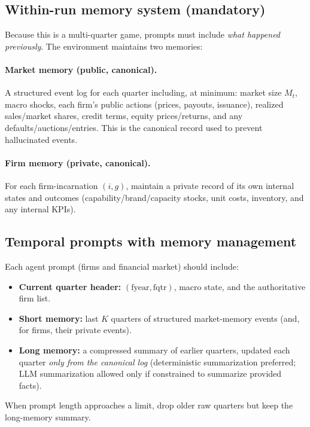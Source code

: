 \documentclass[11pt]{article}
\begin{document}
\subsection{Within-run memory system (mandatory)}
Because this is a multi-quarter game, prompts must include \emph{what happened previously}. The environment maintains two memories:

\paragraph{Market memory (public, canonical).}
A structured event log for each quarter including, at minimum:
market size $M_t$, macro shocks, each firm's public actions (prices, payouts, issuance), realized sales/market shares, credit terms, equity prices/returns, and any defaults/auctions/entries.
This is the canonical record used to prevent hallucinated events.

\paragraph{Firm memory (private, canonical).}
For each firm-incarnation $(i,g)$, maintain a private record of its own internal states and outcomes (capability/brand/capacity stocks, unit costs, inventory, and any internal KPIs).

\subsection{Temporal prompts with memory management}
Each agent prompt (firms and financial market) should include:
\begin{itemize}[leftmargin=*]
    \item \textbf{Current quarter header:} $(\text{fyear},\text{fqtr})$, macro state, and the authoritative firm list.
    \item \textbf{Short memory:} last $K$ quarters of structured market-memory events (and, for firms, their private events).
    \item \textbf{Long memory:} a compressed summary of earlier quarters, updated each quarter \emph{only from the canonical log} (deterministic summarization preferred; LLM summarization allowed only if constrained to summarize provided facts).
\end{itemize}
When prompt length approaches a limit, drop older raw quarters but keep the long-memory summary.
\end{document}
